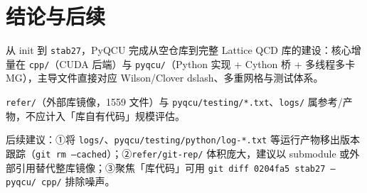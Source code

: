 \documentclass[UTF8]{ctexart}
\begin{document}
\section{结论与后续}

\begin{conclbox}
从 init 到 \texttt{stab27}，PyQCU 完成从空仓库到完整 Lattice QCD 库的建设：核心增量在 \texttt{cpp/}（CUDA 后端）与 \texttt{pyqcu/}（Python 实现 + Cython 桥 + 多线程多卡 MG），主导文件直接对应 Wilson/Clover dslash、多重网格与测试体系。
\end{conclbox}

\begin{refbox}
\texttt{refer/}（外部库镜像，1559 文件）与 \texttt{pyqcu/testing/*.txt}、\texttt{logs/} 属参考/产物，不应计入「库自有代码」规模评估。
\end{refbox}

\begin{warnbox}
后续建议：①将 \texttt{logs/}、\texttt{pyqcu/testing/python/log-*.txt} 等运行产物移出版本跟踪（\texttt{git rm --cached}）；②\texttt{refer/git-rep/} 体积庞大，建议以 submodule 或外部引用替代整库镜像；③聚焦「库代码」可用 \texttt{git diff 0204fa5 stab27 -- pyqcu/ cpp/} 排除噪声。
\end{warnbox}
\end{document}
